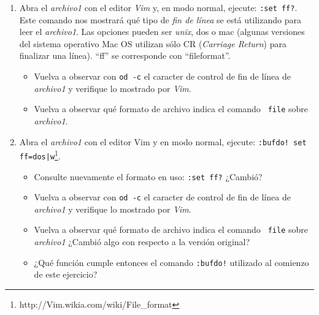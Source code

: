 \documentclass[12pt]{article}
\begin{document}
\begin{enumerate}[resume]

    \item Abra el \emph{archivo1} con el editor \emph{Vim} y, en modo normal,
    ejecute: {\tt :set ff?}. Este comando nos mostrará qué tipo de {\it fin de
    línea} se está utilizando para leer el \emph{archivo1}.  Las opciones
    pueden ser \emph{unix}, dos o mac (algunas versiones del sistema operativo
    Mac OS utilizan sólo CR (\emph{Carriage Return}) para finalizar una
    línea). ``ff'' se corresponde con ``fileformat''.

    \begin{itemize}

        \item Vuelva a observar con {\tt od -c} el caracter de control de fin
        de línea de \emph{archivo1} y verifique lo mostrado por \emph{Vim}. 

        \item Vuelva a observar qué formato de archivo indica el comando {\tt
        file} sobre \emph{archivo1}. 

    \end{itemize} 

    \item Abra el \emph{archivo1} con el editor Vim y en modo normal, ejecute:
    {\tt :bufdo! set
    ff=dos|w}\footnote{http://Vim.wikia.com/wiki/File\_format}. 

    \begin{itemize}

        \item Consulte nuevamente el formato en uso: {\tt :set ff?} ¿Cambió?

        \item Vuelva a observar con {\tt od -c} el caracter de control de fin
        de línea de \emph{archivo1} y verifique lo mostrado por \emph{Vim}. 

        \item Vuelva a observar qué formato de archivo indica el comando {\tt
        file} sobre \emph{archivo1} ¿Cambió algo con respecto a la versión original? 

        \item ¿Qué función cumple entonces el comando {\tt :bufdo!} utilizado
        al comienzo de este ejercicio?

    \end{itemize}

\end{enumerate}
\end{document}

